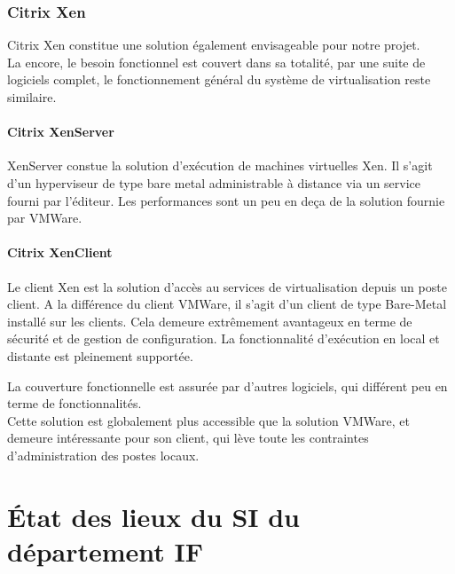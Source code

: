 \subsubsection{Citrix Xen}

Citrix Xen constitue une solution également envisageable pour notre projet. \\
La encore, le besoin fonctionnel est couvert dans sa totalité, par une suite de logiciels complet, le fonctionnement général du système de virtualisation reste similaire.

\paragraph{Citrix XenServer}
XenServer constue la solution d'exécution de machines virtuelles Xen. Il s'agit d'un hyperviseur de type bare metal administrable à distance via un service fourni par l'éditeur. Les performances sont un peu en deça de la solution fournie par VMWare.

\paragraph{Citrix XenClient}
Le client Xen est la solution d'accès au services de virtualisation depuis un poste client. A la différence du client VMWare, il s'agit d'un client de type Bare-Metal installé sur les clients. Cela demeure extrêmement avantageux en terme de sécurité et de gestion de configuration. La fonctionnalité d'exécution en local et distante est pleinement supportée.

La couverture fonctionnelle est assurée par d'autres logiciels, qui différent peu en terme de fonctionnalités.\\

Cette solution est globalement plus accessible que la solution VMWare, et demeure intéressante pour son client, qui lève toute les contraintes d'administration des postes locaux. 

\section{État des lieux du SI du département IF}

